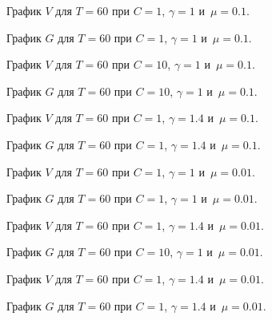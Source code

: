 \begin{figure}[H]
\caption{График $V$ для $T = 60$ при $C = 1$, $\gamma = 1$ и~$\mu = 0.1$.}
\end{figure}
\begin{figure}[H]
\caption{График $G$ для $T = 60$ при $C = 1$, $\gamma = 1$ и~$\mu = 0.1$.}
\end{figure}


\begin{figure}[H]
\caption{График $V$ для $T = 60$ при $C = 10$, $\gamma = 1$ и~$\mu = 0.1$.}
\end{figure}
\begin{figure}[H]
\caption{График $G$ для $T = 60$ при $C = 10$, $\gamma = 1$ и~$\mu = 0.1$.}
\end{figure}


\begin{figure}[H]
\caption{График $V$ для $T = 60$ при $C = 1$, $\gamma = 1.4$ и~$\mu = 0.1$.}
\end{figure}
\begin{figure}[H]
\caption{График $G$ для $T = 60$ при $C = 1$, $\gamma = 1.4$ и~$\mu = 0.1$.}
\end{figure}


\begin{figure}[H]
\caption{График $V$ для $T = 60$ при $C = 1$, $\gamma = 1$ и~$\mu = 0.01$.}
\end{figure}
\begin{figure}[H]
\caption{График $G$ для $T = 60$ при $C = 1$, $\gamma = 1$ и~$\mu = 0.01$.}
\end{figure}


\begin{figure}[H]
\caption{График $V$ для $T = 60$ при $C = 1$, $\gamma = 1.4$ и~$\mu = 0.01$.}
\end{figure}
\begin{figure}[H]
\caption{График $G$ для $T = 60$ при $C = 10$, $\gamma = 1$ и~$\mu = 0.01$.}
\end{figure}


\begin{figure}[H]
\caption{График $V$ для $T = 60$ при $C = 1$, $\gamma = 1.4$ и~$\mu = 0.01$.}
\end{figure}
\begin{figure}[H]
\caption{График $G$ для $T = 60$ при $C = 1$, $\gamma = 1.4$ и~$\mu = 0.01$.}
\end{figure}
